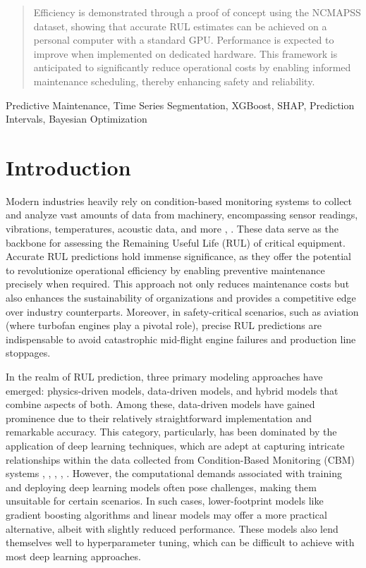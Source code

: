 \documentclass{IEEEtran}
\begin{document}
\begin{abstract}
        Efficiency is demonstrated through a proof of concept using the NCMAPSS dataset, showing that accurate RUL estimates can be achieved on a personal computer with a standard GPU. Performance is expected to improve when implemented on dedicated hardware. This framework is anticipated to significantly reduce operational costs by enabling informed maintenance scheduling, thereby enhancing safety and reliability.
    \end{abstract}
    \begin{IEEEkeywords}
        Predictive Maintenance, Time Series Segmentation, XGBoost, SHAP, Prediction Intervals, Bayesian Optimization
    \end{IEEEkeywords}

    \section{Introduction}

        Modern industries heavily rely on condition-based monitoring systems to collect and analyze vast amounts of data from machinery, encompassing sensor readings, vibrations, temperatures, acoustic data, and more \cite{Azari2023}, \cite{Achouch2022}. These data serve as the backbone for assessing the Remaining Useful Life (RUL) of critical equipment. Accurate RUL predictions hold immense significance, as they offer the potential to revolutionize operational efficiency by enabling preventive maintenance precisely when required. This approach not only reduces maintenance costs but also enhances the sustainability of organizations and provides a competitive edge over industry counterparts. Moreover, in safety-critical scenarios, such as aviation (where turbofan engines play a pivotal role), precise RUL predictions are indispensable to avoid catastrophic mid-flight engine failures and production line stoppages.

        In the realm of RUL prediction, three primary modeling approaches have emerged: physics-driven models, data-driven models, and hybrid models that combine aspects of both. Among these, data-driven models have gained prominence due to their relatively straightforward implementation and remarkable accuracy. This category, particularly, has been dominated by the application of deep learning techniques, which are adept at capturing intricate relationships within the data collected from Condition-Based Monitoring (CBM) systems \cite{data-driven-survey}, \cite{phm2021-1st-cnn}, \cite{phm2021-2nd-inception}, \cite{phm2021-3rd-stacked-cnn}, \cite{pi-dl-rul}. However, the computational demands associated with training and deploying deep learning models often pose challenges, making them unsuitable for certain scenarios. In such cases, lower-footprint models like gradient boosting algorithms and linear models may offer a more practical alternative, albeit with slightly reduced performance. These models also lend themselves well to hyperparameter tuning, which can be difficult to achieve with most deep learning approaches.
\end{document}
